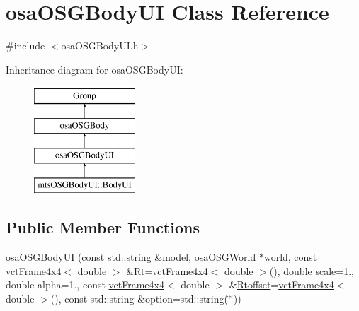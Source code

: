 \hypertarget{classosa_o_s_g_body_u_i}{\section{osa\-O\-S\-G\-Body\-U\-I Class Reference}
\label{classosa_o_s_g_body_u_i}
}


{\ttfamily \#include $<$osa\-O\-S\-G\-Body\-U\-I.\-h$>$}

Inheritance diagram for osa\-O\-S\-G\-Body\-U\-I\-:\begin{figure}[H]
\begin{center}
\leavevmode
\includegraphics[height=4.000000cm]{d8/d47/classosa_o_s_g_body_u_i}
\end{center}
\end{figure}
\subsection*{Public Member Functions}
\begin{DoxyCompactItemize}
\item 
\hyperlink{classosa_o_s_g_body_u_i_a447d7ecccd2158c0ee9558df22997638}{osa\-O\-S\-G\-Body\-U\-I} (const std\-::string \&model, \hyperlink{classosa_o_s_g_world}{osa\-O\-S\-G\-World} $\ast$world, const \hyperlink{classvct_frame4x4}{vct\-Frame4x4}$<$ double $>$ \&Rt=\hyperlink{classvct_frame4x4}{vct\-Frame4x4}$<$ double $>$(), double scale=1., double alpha=1., const \hyperlink{classvct_frame4x4}{vct\-Frame4x4}$<$ double $>$ \&\hyperlink{classosa_o_s_g_body_ad008984bdb0eda300948932eda13974a}{Rtoffset}=\hyperlink{classvct_frame4x4}{vct\-Frame4x4}$<$ double $>$(), const std\-::string \&option=std\-::string(\char`\"{}\char`\"{}))
\end{DoxyCompactItemize}
